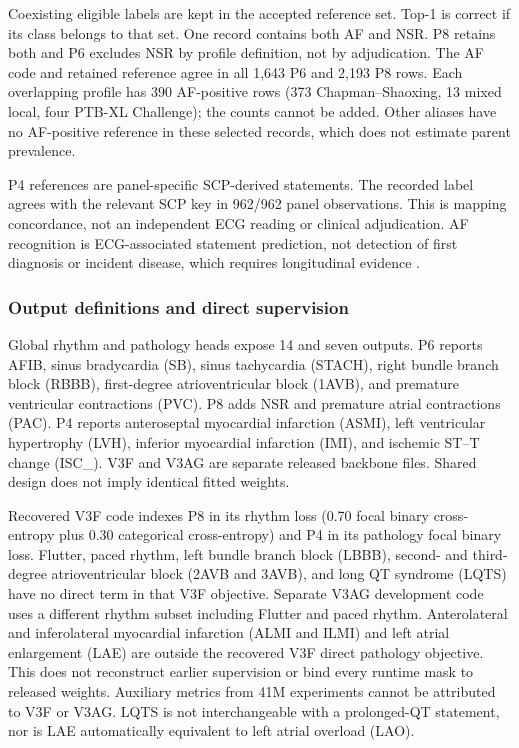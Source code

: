 Coexisting eligible labels are kept in the accepted reference set. Top-1 is correct if its class belongs to that set. One record contains both AF and NSR. P8 retains both and P6 excludes NSR by profile definition, not by adjudication. The AF code and retained reference agree in all 1,643 P6 and 2,193 P8 rows. Each overlapping profile has 390 AF-positive rows (373 Chapman--Shaoxing, 13 mixed local, four PTB-XL Challenge); the counts cannot be added. Other aliases have no AF-positive reference in these selected records, which does not estimate parent prevalence.

P4 references are panel-specific SCP-derived statements. The recorded label agrees with the relevant SCP key in 962/962 panel observations. This is mapping concordance, not an independent ECG reading or clinical adjudication. AF recognition is ECG-associated statement prediction, not detection of first diagnosis or incident disease, which requires longitudinal evidence \citep{Rossi2026AF}.

\subsubsection{Output definitions and direct supervision}
\label{sec:supervision}

Global rhythm and pathology heads expose 14 and seven outputs. P6 reports AFIB, sinus bradycardia (SB), sinus tachycardia (STACH), right bundle branch block (RBBB), first-degree atrioventricular block (1AVB), and premature ventricular contractions (PVC). P8 adds NSR and premature atrial contractions (PAC). P4 reports anteroseptal myocardial infarction (ASMI), left ventricular hypertrophy (LVH), inferior myocardial infarction (IMI), and ischemic ST--T change (ISC\_). V3F and V3AG are separate released backbone files. Shared design does not imply identical fitted weights.

Recovered V3F code indexes P8 in its rhythm loss (0.70 focal binary cross-entropy plus 0.30 categorical cross-entropy) and P4 in its pathology focal binary loss. Flutter, paced rhythm, left bundle branch block (LBBB), second- and third-degree atrioventricular block (2AVB and 3AVB), and long QT syndrome (LQTS) have no direct term in that V3F objective. Separate V3AG development code uses a different rhythm subset including Flutter and paced rhythm. Anterolateral and inferolateral myocardial infarction (ALMI and ILMI) and left atrial enlargement (LAE) are outside the recovered V3F direct pathology objective. This does not reconstruct earlier supervision or bind every runtime mask to released weights. Auxiliary metrics from 41M experiments cannot be attributed to V3F or V3AG. LQTS is not interchangeable with a prolonged-QT statement, nor is LAE automatically equivalent to left atrial overload (LAO).

